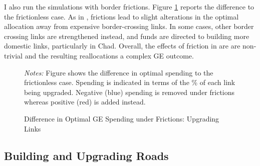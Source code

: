 \documentclass[a4paper]{article}
\begin{document}
I also run the simulations with border frictions. Figure \ref{fig:GE_UGFR} reports the difference to the frictionless case. As in \citet{krantz2024optimal}, frictions lead to slight alterations in the optimal allocation away from expensive border-crossing links. In some cases, other border crossing links are strengthened instead, and funds are directed to building more domestic links, particularly in Chad. Overall, the effects of friction in are are non-trivial and the resulting reallocations a complex GE outcome. \newline 

\begin{figure}[h!] \vspace{-2mm}
\centering
\caption{\label{fig:GE_UGFR} Difference in Optimal GE Spending under Frictions: Upgrading Links}
\vspace{2mm}
\scriptsize 
\emph{Notes:} Figure shows the difference in optimal spending to the frictionless case. Spending is indicated in terms of the \% of each link being upgraded. Negative (blue) spending is removed under frictions whereas positive (red) is added instead. 
\end{figure}


\subsection{Building and Upgrading Roads} 
\end{document}
